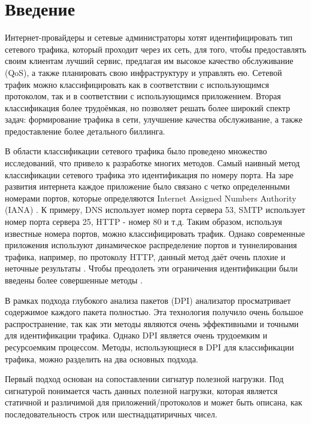 \section{Введение}
\label{sec:Section0} 

Интернет-провайдеры и сетевые администраторы хотят идентифицировать тип сетевого трафика, который проходит через их сеть, для того,
чтобы предоставлять своим клиентам лучший сервис, предлагая им высокое качество обслуживание (QoS),
а также планировать свою инфраструктуру и управлять ею. Сетевой трафик можно классифицировать как в соответствии с использующимся протоколом,
так и в соответствии с использующимся приложением. Вторая классификация более трудоёмкая, но позволяет решать более широкий спектр задач:
формирование трафика в сети, улучшение качества обслуживание, а также предоставление более детального биллинга.

В области классификации сетевого трафика было проведено множество исследований, что привело к разработке многих методов.
Самый наивный метод классификации сетевого трафика это идентификация по номеру порта.
На заре развития интернета каждое приложение было связано с четко определенными номерами портов,
которые определяются Internet Assigned Numbers Authority (IANA) \cite{IANA}.
К примеру, DNS использует номер порта сервера 53,
SMTP использует номер порта сервера 25, HTTP - номер 80 и т.д.
Таким образом, используя известные номера портов, можно классифицировать трафик.
Однако современные приложения используют динамическое распределение портов и туннелирования трафика, например, по протоколу HTTP,
данный метод даёт очень плохие и неточные результаты \cite{dusi2009tunnel}.
Чтобы преодолеть эти ограничения идентификации были введены более совершенные методы \cite{getman2015analys}.

В рамках подхода глубокого анализа пакетов (DPI) анализатор просматривает содержимое каждого пакета полностью.
Эта технология получило очень большое распространение,
так как эти методы являются очень эффективными и точными для идентификации трафика.
Однако DPI является очень трудоемким и ресурсоемким процессом.
Методы, использующиеся в DPI для классификации трафика, можно разделить на два основных подхода.

Первый подход основан на сопоставлении сигнатур полезной нагрузки. Под сигнатурой понимается часть данных полезной нагрузки,
которая является статичной и различимой для приложений/протоколов и может быть описана, как последовательность строк или шестнадцатиричных чисел.

